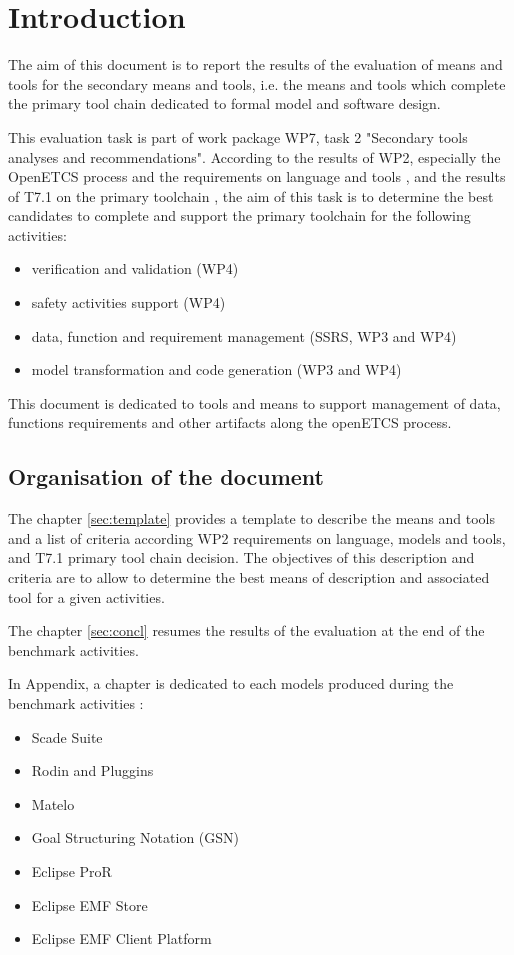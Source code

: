 

\chapter{Introduction}
\label{sec:intro}

The aim of this document is to report the results of the evaluation of means and tools for the secondary means and tools, i.e. the means and tools which complete the primary tool chain dedicated to formal model and software design.

This evaluation task is part of work package WP7, task 2 "Secondary  tools analyses and recommendations". According to the results of WP2, especially the OpenETCS process and the
requirements on language and tools \citep{D2_6}, and the results of T7.1 on the primary toolchain \citep{D7.1},  the aim of this task is to determine the best candidates to complete and support the primary toolchain for the following activities:

\begin{itemize}
\item verification and  validation (WP4)
\item safety activities support (WP4)
\item data, function and requirement management (SSRS, WP3 and WP4)
\item model transformation and code generation (WP3 and WP4)
\end{itemize}

  
This document is dedicated to tools and means to support management of data, functions requirements and other artifacts along  the openETCS process.



\section{Organisation of the document}

The chapter  \ref{sec:template} provides a template to describe the means and tools and a list
of criteria according WP2 requirements on language, models and tools, and T7.1 primary tool chain decision. The objectives of this
description and criteria are to allow to determine the best means of description and associated
tool for a given activities.


The chapter \ref{sec:concl} resumes the results of the evaluation at the end of the benchmark activities.

In Appendix, a chapter is dedicated to each models produced during the benchmark activities :

\begin{itemize}
\item Scade Suite
\item Rodin and Pluggins
\item Matelo
\item Goal Structuring Notation (GSN)
\item Eclipse ProR
\item Eclipse EMF Store
\item Eclipse EMF Client Platform
\end{itemize}




